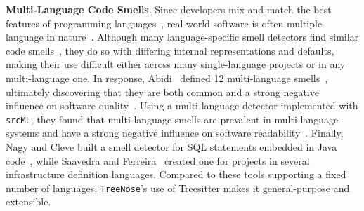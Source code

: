 
{\bf Multi-Language Code Smells}.
%
Since developers mix and match the best features of programming
languages~\cite{7476675}, real-world software is often multiple-language in
nature~\cite{723183}.
%
Although many language-specific smell detectors find similar code
smells~\cite{CheckStyle,DesigniteJava,Jscent,PMD,Pysmell}, they do so with
differing internal representations and defaults, making their use difficult
either across many single-language projects or in any multi-language one.
%
In response, Abidi~\etal{} defined 12 multi-language
smells~\cite{MultiLanguageCodeSmells}, ultimately discovering that they are
both common and a strong negative influence on software quality~\cite{Abidi2}.
%
Using a multi-language detector implemented with \texttt{srcML}, they found
that multi-language smells are prevalent in multi-language systems and have a
strong negative influence on software readability~\cite{Fault-Prone}.
%
Finally, Nagy and Cleve built a smell detector for SQL statements embedded in
Java code~\cite{SQLInJava}, while Saavedra and Ferreira~\cite{Saavedra2023}
created one for projects in several infrastructure definition languages.
%
Compared to these tools supporting a fixed number of languages,
\texttt{TreeNose}'s use of Treesitter makes it general-purpose and extensible.



